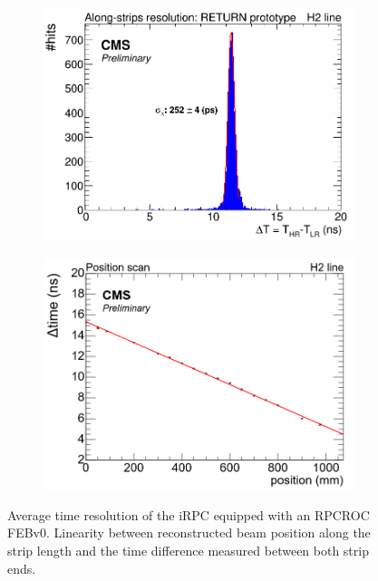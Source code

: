 	\begin{figure}[H]
		\begin{subfigure}{.5\linewidth}
		    \centering
			\includegraphics[width = \linewidth]{fig/chapt6/iRPC-RPCROC-TimeResolution.png}
			\caption{\label{fig:RPCROCv0_Res:A}}
		\end{subfigure}
		\begin{subfigure}{.5\linewidth}
		    \centering
			\includegraphics[width = \linewidth]{fig/chapt6/iRPC-RPCROC-Linearity.png}
			\caption{\label{fig:RPCROCv0_Res:B}}
		\end{subfigure}
		\caption{\label{fig:RPCROCv0_Res}  Average time resolution of the iRPC equipped with an RPCROC FEBv0.  Linearity between reconstructed beam position along the strip length and the time difference measured between both strip ends.}
    \end{figure}

